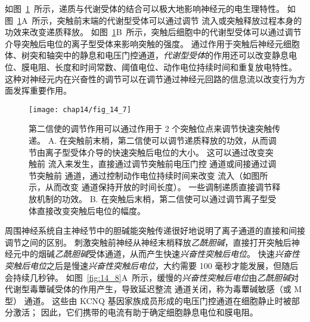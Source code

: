 如图~\ref{fig:14_7}~所示，递质与代谢受体的结合可以极大地影响神经元的电生理特性。
如图~\ref{fig:14_7}A~所示，突触前末端的代谢型受体可以通过调节  流入或突触释放过程本身的功效来改变递质释放。
如图~\ref{fig:14_7}B~所示，突触后细胞中的代谢型受体可以通过调节介导突触后电位的离子型受体来影响突触的强度。
通过作用于突触后神经元细胞体、树突和轴突中的静息和电压门控通道，\textit{代谢型受体}的作用还可以改变静息电位、膜电阻、长度和时间常数、阈值电位、动作电位持续时间和重复放电特性。
这种对神经元内在兴奋性的调节可以在调节通过神经元回路的信息流以改变行为方面发挥重要作用。


\begin{figure}[htbp]
	\centering
	\texttt{[image: chap14/fig\_14\_7]}
	\caption{第二信使的调节作用可以通过作用于 2 个突触位点来调节快速突触传递。
		A. 在突触前末梢，第二信使可以调节递质释放的功效，从而调节由离子型受体介导的快速突触后电位的大小。
		这可以通过改变突触前  流入来发生，直接通过调节突触前电压门控  通道或间接通过调节突触前  通道，通过控制动作电位持续时间来改变  流入（如图所示，从而改变  通道保持开放的时间长度）。
		一些调制递质直接调节释放机制的功效。
		B. 在突触后末梢，第二信使可以通过调节离子型受体直接改变突触后电位的幅度。}
	\label{fig:14_7}
\end{figure}


周围神经系统自主神经节中的胆碱能突触传递很好地说明了离子通道的直接和间接调节之间的区别。
刺激突触前神经从神经末梢释放\textit{乙酰胆碱}，直接打开突触后神经元中的烟碱\textit{乙酰胆碱}受体通道，从而产生快速\textit{兴奋性突触后电位}。
快速\textit{兴奋性突触后电位}之后是慢速\textit{兴奋性突触后电位}，大约需要 100 毫秒才能发展，但随后会持续几秒钟。
如图~\ref{fig:14_8}A~所示，缓慢的\textit{兴奋性突触后电位}由\textit{乙酰胆碱}对代谢型毒蕈碱受体的作用产生，导致延迟整流  通道关闭，称为毒蕈碱敏感（或 M 型） 通道。
这些由 KCNQ 基因家族成员形成的电压门控通道在细胞静止时被部分激活；
因此，它们携带的电流有助于确定细胞静息电位和膜电阻。


